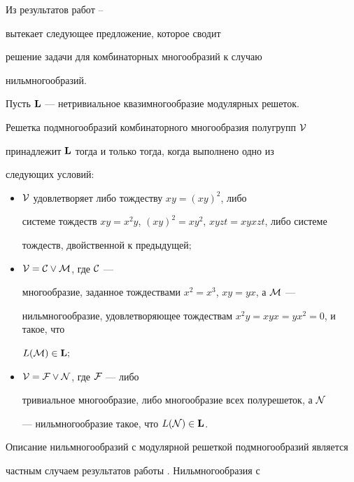 Из результатов работ \cite{Vol89}--\cite{Vol92b}


вытекает следующее предложение, которое сводит


решение задачи для комбинаторных многообразий к случаю


нильмногообразий. 





\begin{prop}


\label{red to nil}


Пусть $\bold L$ --- нетривиальное квазимногообразие модулярных решеток.


Решетка подмногообразий комбинаторного многообразия полугрупп $\cal V$


принадлежит $\bold L$ тогда и только тогда, когда выполнено одно из


следующих условий\/${:}$


\begin{itemize}


\item[1)] $\cal V$ удовлетворяет либо тождеству $xy=(xy)^2$, либо


системе тождеств $xy=x^2y$, $(xy)^2=xy^2$, $xyzt=xyxzt$, либо системе


тождеств, двойственной к предыдущей\/$;$


\item[2)] $\cal V=\cal C\vee\cal M$, где $\cal C$ ---


многообразие, заданное тождествами $x^2=x^3$, $xy=yx$, а $\cal M$ ---


нильмногообразие, удовлетворяющее тождествам $x^2y=xyx=yx^2=0$, и такое, что


$L(\cal M)\in\bold L;$


\item[3)] $\cal V=\cal F\vee\cal N$, где $\cal F$ --- либо


тривиальное многообразие, либо многообразие всех полурешеток, а $\cal N$


--- нильмногообразие такое, что $L(\cal N)\in\bold L$.


\end{itemize}


\end{prop}





Описание нильмногообразий с модулярной решеткой подмногообразий является


частным случаем результатов работы \cite{Vol92c}. Нильмногообразия с


